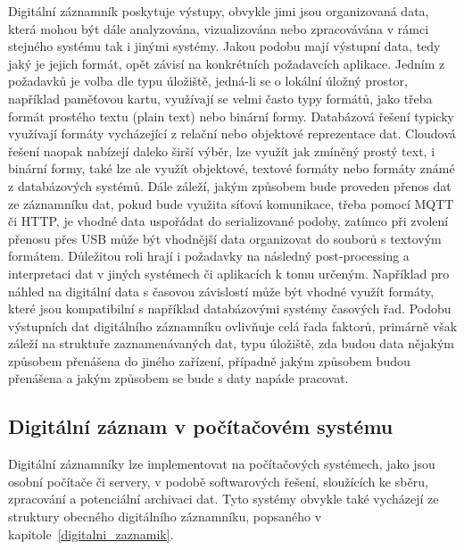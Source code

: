 Digitální záznamník poskytuje výstupy, obvykle jimi jsou organizovaná data, která mohou být dále analyzována, vizualizována nebo zpracovávána v rámci stejného systému tak i jinými systémy. Jakou podobu mají výstupní data, tedy jaký je jejich formát, opět závisí na konkrétních požadavcích aplikace. Jedním z požadavků je volba dle typu úložiště, jedná-li se o lokální úložný prostor, například paměťovou kartu, využívají se velmi často typy formátů, jako třeba formát prostého textu (plain text) nebo binární formy. Databázová řešení typicky využívají formáty vycházející z relační nebo objektové reprezentace dat. Cloudová řešení naopak nabízejí daleko širší výběr, lze využít jak zmíněný prostý text, i binární formy, také lze ale využít objektové, textové formáty nebo formáty známé z databázových systémů. Dále záleží, jakým způsobem bude proveden přenos dat ze záznamníku dat, pokud bude využita síťová komunikace, třeba pomocí MQTT či HTTP, je vhodné data uspořádat do serializované podoby, zatímco při zvolení přenosu přes USB může být vhodnější data organizovat do souborů s textovým formátem. Důležitou roli hrají i požadavky na následný post-processing a interpretaci dat v jiných systémech či aplikacích k tomu určeným. Například pro náhled na digitální data s časovou závislostí může být vhodné využít formáty, které jsou kompatibilní s například databázovými systémy časových řad. Podobu výstupních dat digitálního záznamníku ovlivňuje celá řada faktorů, primárně však záleží na struktuře zaznamenávaných dat, typu úložiště, zda budou data nějakým způsobem přenášena do jiného zařízení, případně jakým způsobem budou přenášena a jakým způsobem se bude s daty napáde pracovat. \cite{medium_optimalization_iot_data_storage_timescaledb}


\subsection{Digitální záznam v počítačovém systému}
Digitální záznamníky lze implementovat na počítačových systémech, jako jsou osobní počítače či servery, v podobě softwarových řešení, sloužících ke sběru, zpracování a potenciální archivaci dat. Tyto systémy obvykle také vycházejí ze struktury obecného digitálního záznamníku, popsaného v kapitole~\ref{digitalni_zaznamik}. 

